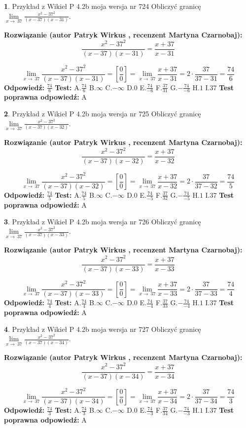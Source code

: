 \documentclass[12pt, a4paper]{article}
\theoremstyle{definition} %
\newtheorem{zad}{}
\newcommand{\zadStart}[1]{\begin{zad}#1\newline}
\newcommand{\zadStop}{\end{zad}}
\newcommand{\rozwStart}[2]{\noindent \textbf{Rozwiązanie (autor #1 , recenzent #2): }\newline}
\newcommand{\rozwStop}{\newline}
\newcommand{\odpStart}{\noindent \textbf{Odpowiedź:}\newline}
\newcommand{\odpStop}{\newline}
\newcommand{\testStart}{\noindent \textbf{Test:}\newline}
\newcommand{\testStop}{\newline}
\newcommand{\kluczStart}{\noindent \textbf{Test poprawna odpowiedź:}\newline}
\newcommand{\kluczStop}{\newline}
\begin{document}
\zadStart{Przykład z Wikieł P 4.2b moja wersja nr 724}
Obliczyć granicę $\lim\limits_{x\to\ 37}\frac{x^{2}-37^{2}}{(x-37)(x-31)}$.
\zadStop
\rozwStart{Patryk Wirkus}{Martyna Czarnobaj}
$$\frac{x^{2}-37^{2}}{(x-37)(x-31)}=\frac{x+37}{x-31}$$

$$\lim\limits_{x\to\ 37}\frac{x^{2}-37^{2}}{(x-37)(x-31)}=[\frac{0}{0}]=\lim\limits_{x\to\ 37}\frac{x+37}{x-31}=2 \cdot \frac{37}{37-31} = \frac{74}{6}$$
\rozwStop
\odpStart
$\frac{74}{6}$
\odpStop
\testStart
A.$\frac{74}{6}$
B.$\infty$
C.$-\infty$
D.$0$
E.$\frac{74}{-6}$
F.$\frac{37}{31}$
G.$-\frac{74}{-6}$
H.$1$
I.$37$
\testStop
\kluczStart
A
\kluczStop



\zadStart{Przykład z Wikieł P 4.2b moja wersja nr 725}
Obliczyć granicę $\lim\limits_{x\to\ 37}\frac{x^{2}-37^{2}}{(x-37)(x-32)}$.
\zadStop
\rozwStart{Patryk Wirkus}{Martyna Czarnobaj}
$$\frac{x^{2}-37^{2}}{(x-37)(x-32)}=\frac{x+37}{x-32}$$

$$\lim\limits_{x\to\ 37}\frac{x^{2}-37^{2}}{(x-37)(x-32)}=[\frac{0}{0}]=\lim\limits_{x\to\ 37}\frac{x+37}{x-32}=2 \cdot \frac{37}{37-32} = \frac{74}{5}$$
\rozwStop
\odpStart
$\frac{74}{5}$
\odpStop
\testStart
A.$\frac{74}{5}$
B.$\infty$
C.$-\infty$
D.$0$
E.$\frac{74}{-5}$
F.$\frac{37}{32}$
G.$-\frac{74}{-5}$
H.$1$
I.$37$
\testStop
\kluczStart
A
\kluczStop



\zadStart{Przykład z Wikieł P 4.2b moja wersja nr 726}
Obliczyć granicę $\lim\limits_{x\to\ 37}\frac{x^{2}-37^{2}}{(x-37)(x-33)}$.
\zadStop
\rozwStart{Patryk Wirkus}{Martyna Czarnobaj}
$$\frac{x^{2}-37^{2}}{(x-37)(x-33)}=\frac{x+37}{x-33}$$

$$\lim\limits_{x\to\ 37}\frac{x^{2}-37^{2}}{(x-37)(x-33)}=[\frac{0}{0}]=\lim\limits_{x\to\ 37}\frac{x+37}{x-33}=2 \cdot \frac{37}{37-33} = \frac{74}{4}$$
\rozwStop
\odpStart
$\frac{74}{4}$
\odpStop
\testStart
A.$\frac{74}{4}$
B.$\infty$
C.$-\infty$
D.$0$
E.$\frac{74}{-4}$
F.$\frac{37}{33}$
G.$-\frac{74}{-4}$
H.$1$
I.$37$
\testStop
\kluczStart
A
\kluczStop



\zadStart{Przykład z Wikieł P 4.2b moja wersja nr 727}
Obliczyć granicę $\lim\limits_{x\to\ 37}\frac{x^{2}-37^{2}}{(x-37)(x-34)}$.
\zadStop
\rozwStart{Patryk Wirkus}{Martyna Czarnobaj}
$$\frac{x^{2}-37^{2}}{(x-37)(x-34)}=\frac{x+37}{x-34}$$

$$\lim\limits_{x\to\ 37}\frac{x^{2}-37^{2}}{(x-37)(x-34)}=[\frac{0}{0}]=\lim\limits_{x\to\ 37}\frac{x+37}{x-34}=2 \cdot \frac{37}{37-34} = \frac{74}{3}$$
\rozwStop
\odpStart
$\frac{74}{3}$
\odpStop
\testStart
A.$\frac{74}{3}$
B.$\infty$
C.$-\infty$
D.$0$
E.$\frac{74}{-3}$
F.$\frac{37}{34}$
G.$-\frac{74}{-3}$
H.$1$
I.$37$
\testStop
\kluczStart
A
\kluczStop
\end{document}
